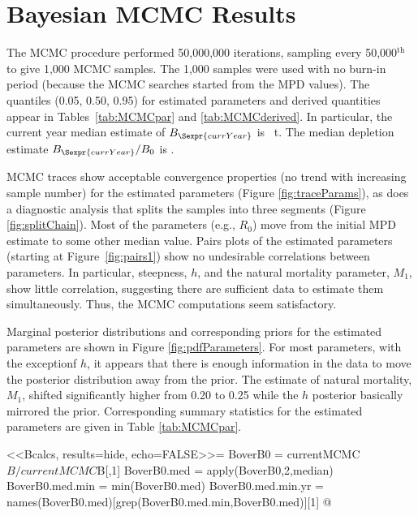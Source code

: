 \section{Bayesian MCMC Results}

The MCMC procedure performed 50,000,000 iterations, sampling every 50,000$^\mathrm{th}$ to give 1,000 MCMC samples.  The 1,000 samples were used with no burn-in period (because the MCMC searches started from the MPD values). The quantiles (0.05, 0.50, 0.95) for estimated parameters and derived quantities appear in Tables~\ref{tab:MCMCpar} and \ref{tab:MCMCderived}. In particular, the current year median estimate of $B_{\Sexpr{currYear}}$ is ~t. The median depletion estimate $B_{\Sexpr{currYear}}/B_0$ is  .

MCMC traces show acceptable convergence properties (no trend with increasing sample number) for the estimated parameters (Figure \ref{fig:traceParams}), as does a diagnostic analysis that splits the samples into three segments (Figure \ref{fig:splitChain}). Most of the parameters (e.g., $R_0$) move from the initial MPD estimate to some other median value.  Pairs plots of the estimated parameters (starting at Figure~\ref{fig:pairs1}) show no undesirable correlations between parameters.  In particular, steepness, $h$, and the natural mortality parameter, $M_1$, show little correlation, suggesting there are sufficient data to estimate them simultaneously. Thus, the MCMC computations seem satisfactory.

Marginal posterior distributions and corresponding priors for the estimated parameters are shown in Figure \ref{fig:pdfParameters}. For most parameters, with the exceptionf $h$, it appears that there is enough information in the data to move the posterior distribution away from the prior. The estimate of natural mortality, $M_1$, shifted significantly higher from 0.20 to 0.25 while the $h$ posterior basically mirrored the prior. Corresponding summary statistics for the estimated parameters are given in Table \ref{tab:MCMCpar}.

<<Bcalcs, results=hide, echo=FALSE>>=
BoverB0 = currentMCMC$B/currentMCMC$B[,1]
BoverB0.med = apply(BoverB0,2,median)
BoverB0.med.min = min(BoverB0.med)
BoverB0.med.min.yr = names(BoverB0.med)[grep(BoverB0.med.min,BoverB0.med)][1]
@

